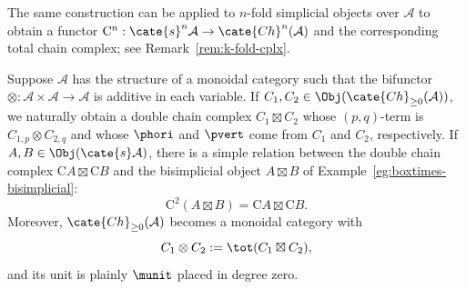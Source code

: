 The same construction can be applied to $n$-fold simplicial objects over
$\mathcal{A}$ to obtain a functor
$\mathrm{C}^n:\cate{s}^n\mathcal{A}\to\cate{Ch}^n(\mathcal{A})$ and the
corresponding total chain complex; see Remark~\ref{rem:k-fold-cplx}.

\begin{example}\label{eg:tensor-bisimplicial}
	Suppose $\mathcal{A}$ has the structure of a monoidal category such that
	the bifunctor $\otimes:\mathcal{A}\times\mathcal{A}\to\mathcal{A}$ is
	additive in each variable. If
	$C_1,C_2\in\Obj(\cate{Ch}_{\geq0}(\mathcal{A}))$, we naturally obtain a
	double chain complex $C_1\boxtimes C_2$ whose $(p,q)$-term is
	$C_{1,p}\otimes C_{2,q}$ and whose $\phori$ and $\pvert$ come from $C_1$
	and $C_2$, respectively. If $A,B\in\Obj(\cate{s}\mathcal{A})$, there is
	a simple relation between the double chain complex
	$\mathrm{C}A\boxtimes\mathrm{C}B$ and the bisimplicial object
	$A\boxtimes B$ of Example~\ref{eg:boxtimes-bisimplicial}:
	\[ \mathrm{C}^2 (A \boxtimes B) = \mathrm{C}A \boxtimes \mathrm{C}B. \]
	Moreover, $\cate{Ch}_{\geq0}(\mathcal{A})$ becomes a monoidal category
	with
	\[ C_1 \otimes C_2 := \tot(C_1 \boxtimes C_2), \]
	and its unit is plainly $\munit$ placed in degree zero.
\end{example}
